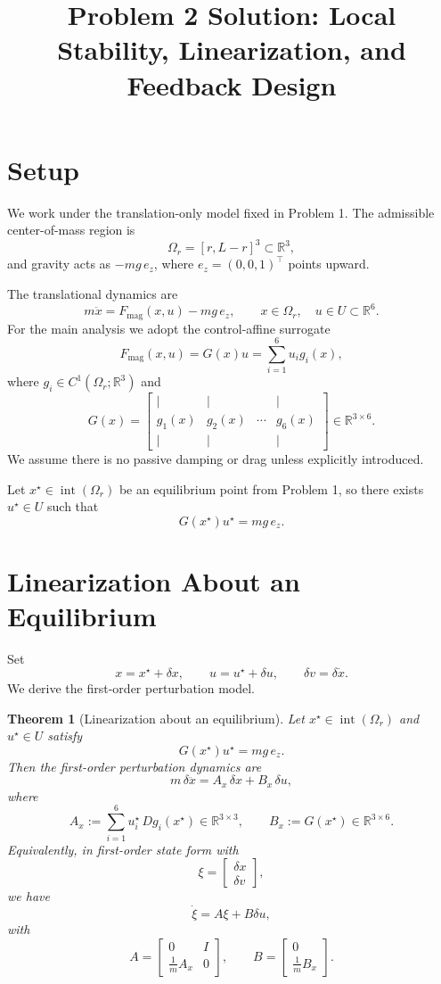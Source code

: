 \documentclass[11pt]{article}
\title{\textbf{Problem 2 Solution: Local Stability, Linearization, and Feedback Design}}
\author{}
\date{}
\newtheorem{theorem}{Theorem}
\theoremstyle{definition}
\begin{document}
\maketitle

\section{Setup}

We work under the translation-only model fixed in Problem 1. The admissible center-of-mass region is
\[
\Omega_r=[r,L-r]^3 \subset \mathbb{R}^3,
\]
and gravity acts as $-mg\,e_z$, where $e_z=(0,0,1)^\top$ points upward.

The translational dynamics are
\[
m\ddot x = F_{\mathrm{mag}}(x,u)-mg\,e_z,
\qquad x\in\Omega_r,\quad u\in U\subset\mathbb{R}^6.
\]
For the main analysis we adopt the control-affine surrogate
\[
F_{\mathrm{mag}}(x,u)=G(x)u=\sum_{i=1}^6 u_i g_i(x),
\]
where $g_i\in C^1(\Omega_r;\mathbb{R}^3)$ and
\[
G(x)=
\begin{bmatrix}
| & | & & |\\
g_1(x) & g_2(x) & \cdots & g_6(x)\\
| & | & & |
\end{bmatrix}
\in \mathbb{R}^{3\times 6}.
\]
We assume there is no passive damping or drag unless explicitly introduced.

Let $x^\star\in\operatorname{int}(\Omega_r)$ be an equilibrium point from Problem 1, so there exists $u^\star\in U$ such that
\[
G(x^\star)u^\star=mg\,e_z.
\]

\section{Linearization About an Equilibrium}

Set
\[
x=x^\star+\delta x,
\qquad
u=u^\star+\delta u,
\qquad
\delta v=\delta \dot x.
\]
We derive the first-order perturbation model.

\begin{theorem}[Linearization about an equilibrium]
Let $x^\star\in\operatorname{int}(\Omega_r)$ and $u^\star\in U$ satisfy
\[
G(x^\star)u^\star=mg\,e_z.
\]
Then the first-order perturbation dynamics are
\[
m\,\delta \ddot x = A_x\,\delta x + B_x\,\delta u,
\]
where
\[
A_x := \sum_{i=1}^6 u_i^\star\,Dg_i(x^\star) \in \mathbb{R}^{3\times 3},
\qquad
B_x := G(x^\star) \in \mathbb{R}^{3\times 6}.
\]
Equivalently, in first-order state form with
\[
\xi=
\begin{bmatrix}
\delta x\\
\delta v
\end{bmatrix},
\]
we have
\[
\dot \xi = A\xi+B\delta u,
\]
with
\[
A=
\begin{bmatrix}
0&I\\
\frac{1}{m}A_x&0
\end{bmatrix},
\qquad
B=
\begin{bmatrix}
0\\
\frac{1}{m}B_x
\end{bmatrix}.
\]
\end{theorem}
\end{document}
